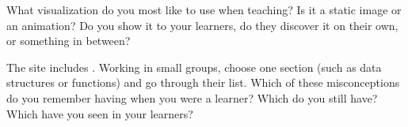 
What visualization do you most like to use when teaching? Is it a static
image or an animation? Do you show it to your learners, do they discover
it on their own, or something in between?


The  site
includes . Working in small groups, choose one
section (such as data structures or functions) and go through their
list. Which of these misconceptions do you remember having when you
were a learner? Which do you still have? Which have you seen in your
learners?
